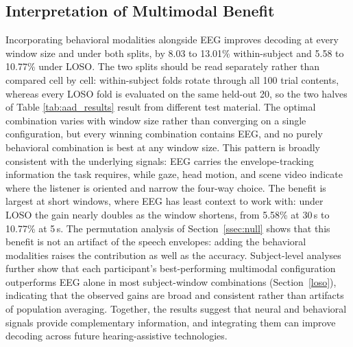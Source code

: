 \documentclass[journal]{IEEEtran}
\begin{document}
\subsection{Interpretation of Multimodal Benefit} \label{sec:interpretation}
Incorporating behavioral modalities alongside EEG improves decoding at every window size and under both splits, by 8.03 to 13.01\% within-subject and 5.58 to 10.77\% under LOSO. The two splits should be read separately rather than compared cell by cell: within-subject folds rotate through all 100 trial contents, whereas every LOSO fold is evaluated on the same held-out 20, so the two halves of Table \ref{tab:aad_results} result from different test material. The optimal combination varies with window size rather than converging on a single configuration, but every winning combination contains EEG, and no purely behavioral combination is best at any window size. This pattern is broadly consistent with the underlying signals: EEG carries the envelope-tracking information the task requires, while gaze, head motion, and scene video indicate where the listener is oriented and narrow the four-way choice. The benefit is largest at short windows, where EEG has least context to work with: under LOSO the gain nearly doubles as the window shortens, from 5.58\% at 30\,s to 10.77\% at 5\,s. The permutation analysis of Section~\ref{ssec:null} shows that this benefit is not an artifact of the speech envelopes: adding the behavioral modalities raises the contribution as well as the accuracy. Subject-level analyses further show that each participant's best-performing multimodal configuration outperforms EEG alone in most subject-window combinations (Section~\ref{loso}), indicating that the observed gains are broad and consistent rather than artifacts of population averaging.
Together, the results suggest that neural and behavioral signals provide complementary information, and integrating them can improve decoding across future hearing-assistive technologies.
\end{document}

